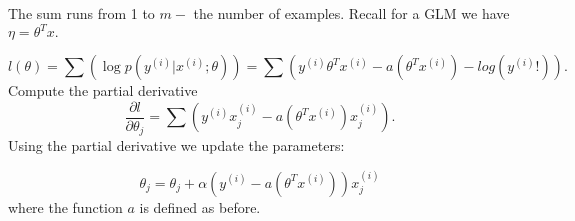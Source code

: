 \begin{answer}
The sum runs from 1 to $m-$ the number of examples. Recall for a GLM we have $\eta = \theta^T x.$

$$l(\theta) = \sum(\log p(y^{(i)} | x^{(i)}; \theta)) = 
\sum(y^{(i)}\theta^T x^{(i)} -a(\theta^T x^{(i)}) - log(y^{(i)}!)).$$
Compute the partial derivative
$$\frac{\partial l}{\partial \theta_j}= \sum(y^{(i)} x_j^{(i)} - a(\theta^T x^{(i)}) x_j^{(i)}).$$
Using the partial derivative we update the parameters:

$$\theta_j = \theta_j + \alpha (y^{(i)}  - a(\theta^T x^{(i)})) x_j^{(i)}$$
where the function $a$ is defined as before.
\end{answer}
